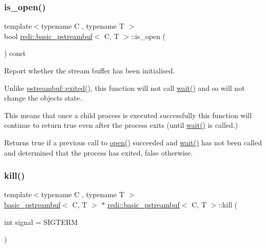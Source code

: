 \subsubsection{\texorpdfstring{is\+\_\+open()}{is\_open()}}
{\footnotesize\ttfamily template$<$typename C , typename T $>$ \\
bool \mbox{\hyperlink{classredi_1_1basic__pstreambuf}{redi\+::basic\+\_\+pstreambuf}}$<$ C, T $>$\+::is\+\_\+open (\begin{DoxyParamCaption}{ }\end{DoxyParamCaption}) const\hspace{0.3cm}{\ttfamily [inline]}}



Report whether the stream buffer has been initialised. 

Unlike \mbox{\hyperlink{classredi_1_1basic__pstreambuf_a9ed1ec24bfa867c99b6bf8a35a94d063}{pstreambuf\+::exited()}}, this function will not call \mbox{\hyperlink{classredi_1_1basic__pstreambuf_afa976526cfb7ea56e29afbee8ead68e1}{wait()}} and so will not change the object\textquotesingle{}s state.

This means that once a child process is executed successfully this function will continue to return true even after the process exits (until \mbox{\hyperlink{classredi_1_1basic__pstreambuf_afa976526cfb7ea56e29afbee8ead68e1}{wait()}} is called.)

\begin{DoxyReturn}{Returns}
true if a previous call to \mbox{\hyperlink{classredi_1_1basic__pstreambuf_ac91e4317d9e95b4551513a00e3d82996}{open()}} succeeded and \mbox{\hyperlink{classredi_1_1basic__pstreambuf_afa976526cfb7ea56e29afbee8ead68e1}{wait()}} has not been called and determined that the process has exited, false otherwise. 
\end{DoxyReturn}
\mbox{\label{classredi_1_1basic__pstreambuf_a6648f57f7aa212f986365101a66d5350}} 
\subsubsection{\texorpdfstring{kill()}{kill()}}
{\footnotesize\ttfamily template$<$typename C , typename T $>$ \\
\mbox{\hyperlink{classredi_1_1basic__pstreambuf}{basic\+\_\+pstreambuf}}$<$ C, T $>$ $\ast$ \mbox{\hyperlink{classredi_1_1basic__pstreambuf}{redi\+::basic\+\_\+pstreambuf}}$<$ C, T $>$\+::kill (\begin{DoxyParamCaption}\item[{int}]{signal = {\ttfamily SIGTERM} }\end{DoxyParamCaption})\hspace{0.3cm}{\ttfamily [inline]}}



